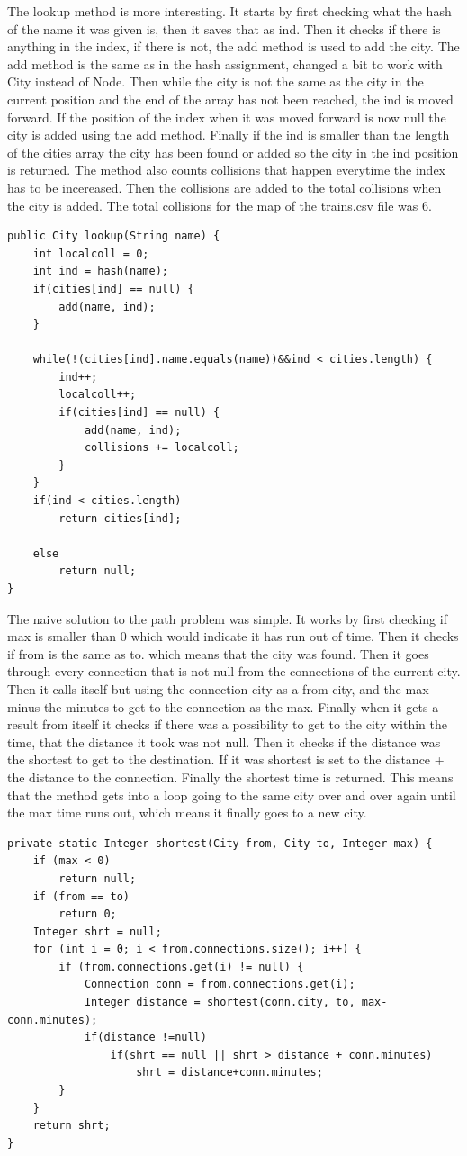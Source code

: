 \documentclass[a4paper,11pt]{article}
\begin{document}
The lookup method is more interesting. It starts by first checking what the hash of the name it was given is, then it saves that as ind. Then it checks if there is anything in the index, if there is not, the add method is used to add the city. The add method is the same as in the hash assignment, changed a bit to work with City instead of Node. 
Then while the city is not the same as the city in the current position and the end of the array has not been reached, the ind is moved forward. If the position of the index when it was moved forward is now null the city is added using the add method. Finally if the ind is smaller than the length of the cities array the city has been found or added so the city in the ind position is returned. The method also counts collisions that happen everytime the index has to be incereased. 
Then the collisions are added to the total collisions when the city is added. The total collisions for the map of the trains.csv file was 6.
\begin{verbatim}
public City lookup(String name) {
    int localcoll = 0;
    int ind = hash(name);
    if(cities[ind] == null) {
        add(name, ind);
    }

    while(!(cities[ind].name.equals(name))&&ind < cities.length) {
        ind++;
        localcoll++;
        if(cities[ind] == null) {
            add(name, ind);
            collisions += localcoll;
        }
    }
    if(ind < cities.length)
        return cities[ind];
    
    else
        return null;
}
\end{verbatim} 
The naive solution to the path problem was simple. It works by first checking if max is smaller than 0 which would indicate it has run out of time. Then it checks if from is the same as to. which means that the city was found. Then it goes through every connection that is not null from the connections of the current city. 
Then it calls itself but using the connection city as a from city, and the max minus the minutes to get to the connection as the max. Finally when it gets a result from itself it checks if there was a possibility to get to the city within the time, that the distance it took was not null. Then it checks if the distance was the shortest to get to the destination. If it was 
shortest is set to the distance + the distance to the connection. Finally the shortest time is returned. This means that the method gets into a loop going to the same city over and over again until the max time runs out, which means it finally goes to a new city. 
\begin{verbatim}
private static Integer shortest(City from, City to, Integer max) {
    if (max < 0)
        return null;
    if (from == to)
        return 0;
    Integer shrt = null;
    for (int i = 0; i < from.connections.size(); i++) {
        if (from.connections.get(i) != null) {
            Connection conn = from.connections.get(i);
            Integer distance = shortest(conn.city, to, max-conn.minutes);
            if(distance !=null)
                if(shrt == null || shrt > distance + conn.minutes)
                    shrt = distance+conn.minutes;
        }
    }
    return shrt;
} 
\end{verbatim}
\end{document}
